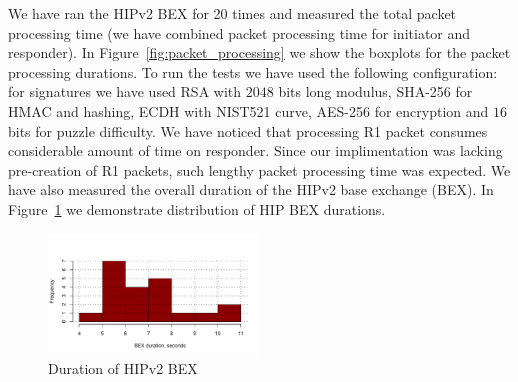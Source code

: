 We have ran the HIPv2 BEX for 20 times and measured the total packet processing time (we have combined packet 
processing time for initiator and responder). In Figure~\ref{fig:packet_processing} we show the boxplots for 
the packet processing durations. To run the tests we have used the following configuration: for signatures 
we have used RSA with $2048$ bits long modulus, SHA-256 for HMAC and hashing, ECDH with NIST521 curve, 
AES-256 for encryption and $16$ bits for puzzle difficulty. We have noticed that processing R1 packet consumes considerable
amount of time on responder. Since our implimentation was lacking pre-creation of R1 packets, such lengthy packet 
processing time was expected. We have also measured the overall duration of the HIPv2 base exchange (BEX). 
In Figure~\ref{fig:duration_bex} we demonstrate distribution of HIP BEX durations.

\begin{figure}
	\includegraphics[width=0.5\textwidth]{graphics/duration_bex.pdf}
	\caption{Duration of HIPv2 BEX}
	\label{fig:duration_bex}
\end{figure}
